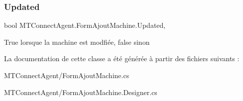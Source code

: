 \subsubsection{\texorpdfstring{Updated}{Updated}}
{\footnotesize\ttfamily bool M\+T\+Connect\+Agent.\+Form\+Ajout\+Machine.\+Updated\hspace{0.3cm}{\ttfamily [get]}, {\ttfamily [set]}}



True lorsque la machine est modfiée, false sinon 



La documentation de cette classe a été générée à partir des fichiers suivants \+:\begin{DoxyCompactItemize}
\item 
M\+T\+Connect\+Agent/Form\+Ajout\+Machine.\+cs\item 
M\+T\+Connect\+Agent/Form\+Ajout\+Machine.\+Designer.\+cs\end{DoxyCompactItemize}
